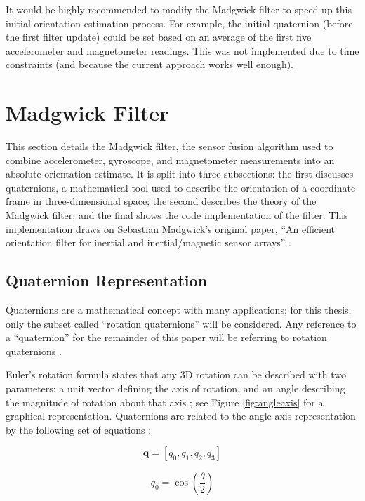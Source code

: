 \documentclass[11pt]{ucthesisCP}
\begin{document}
It would be highly recommended to modify the Madgwick filter to speed up this initial orientation estimation process. For example, the initial quaternion (before the first filter update) could be set based on an average of the first five accelerometer and magnetometer readings. This was not implemented due to time constraints (and because the current approach works well enough).

\section{Madgwick Filter} \label{sec:4s4}
This section details the Madgwick filter, the sensor fusion algorithm used to combine accelerometer, gyroscope, and magnetometer measurements into an absolute orientation estimate. It is split into three subsections: the first discusses quaternions, a mathematical tool used to describe the orientation of a coordinate frame in three-dimensional space; the second describes the theory of the Madgwick filter; and the final shows the code implementation of the filter. This implementation draws on Sebastian Madgwick’s original paper, “An efficient orientation filter for inertial and inertial/magnetic sensor arrays” \cite{madgwick}.

\subsection{Quaternion Representation} \label{ssec:4s4s1}
Quaternions are a mathematical concept with many applications; for this thesis, only the subset called “rotation quaternions” will be considered. Any reference to a “quaternion” for the remainder of this paper will be referring to rotation quaternions \cite{quaternionuse}. 

Euler’s rotation formula states that any 3D rotation can be described with two parameters: a unit vector defining the axis of rotation, and an angle describing the magnitude of rotation about that axis \cite{quaternionuse}; see Figure \ref{fig:angleaxis} for a graphical representation. Quaternions are related to the angle-axis representation by the following set of equations \cite{quaternionuse}:

\begin{equation} \label{eq:qdef}
\mathbf{q} = [q_0, q_1, q_2, q_3]
\end{equation}

\begin{equation} \label{eq:q0}
q_0 = \cos\left(\frac{\theta}{2}\right)
\end{equation}
\end{document}

